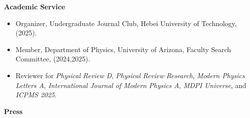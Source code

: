 \documentclass[11pt]{article}
\begin{document}
\medskip

{\Large\textbf{Academic Service}}

\begin{itemize}[leftmargin=*,nosep]
    \item Organizer, Undergraduate Journal Club, Hebei University of Technology, (2025).
    \item Member, Department of Physics, University of Arizona, Faculty Search Committee, (2024,2025).
    \item Reviewer for \textit{Physical Review D}, \textit{Physical Review Research}, \textit{Modern Physics Letters A}, \textit{International Journal of Modern Physics A}, \textit{MDPI Universe}, and \textit{ICPMS 2025}.
\end{itemize}

\medskip

{\Large\textbf{Press}}
\end{document}
